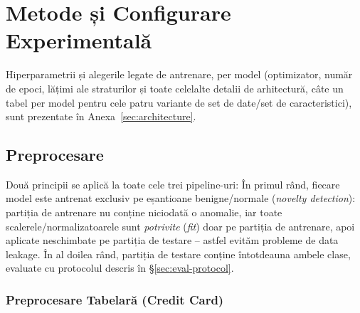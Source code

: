 \chapter{Metode și Configurare Experimentală}
\label{ch:methodology}


Hiperparametrii și alegerile legate de antrenare, per model (optimizator, număr de epoci, lățimi ale straturilor și toate celelalte detalii de arhitectură, câte un tabel per model pentru cele patru variante de set de date/set de caracteristici), sunt prezentate în Anexa~\ref{sec:architecture}.

\section{Preprocesare}
\label{sec:preprocessing}

Două principii se aplică la toate cele trei pipeline-uri:
În primul rând, fiecare model este antrenat exclusiv pe eșantioane benigne/normale (\emph{novelty detection}):
partiția de antrenare nu conține niciodată o anomalie, iar toate scalerele/normalizatoarele sunt \emph{potrivite} (\emph{fit}) doar pe partiția de antrenare, apoi aplicate neschimbate pe partiția de testare -- astfel evităm probleme de data leakage.
În al doilea rând, partiția de testare conține întotdeauna ambele clase, evaluate cu protocolul descris în \S\ref{sec:eval-protocol}.

\subsection{Preprocesare Tabelară (Credit Card)}

